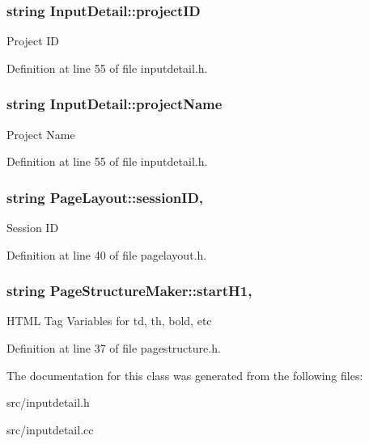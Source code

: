 \hypertarget{classInputDetail_a08069ee622c626c038b821ddcc7427b4}{
\subsubsection[{project\-I\-D}]{\setlength{\rightskip}{0pt plus 5cm}string Input\-Detail\-::project\-I\-D\hspace{0.3cm}{\ttfamily [protected]}}}\label{classInputDetail_a08069ee622c626c038b821ddcc7427b4}
Project I\-D 

Definition at line 55 of file inputdetail.\-h.

\hypertarget{classInputDetail_aaaf51475a2a4ddbe34e38c96bdb45bad}{
\subsubsection[{project\-Name}]{\setlength{\rightskip}{0pt plus 5cm}string Input\-Detail\-::project\-Name\hspace{0.3cm}{\ttfamily [protected]}}}\label{classInputDetail_aaaf51475a2a4ddbe34e38c96bdb45bad}
Project Name 

Definition at line 55 of file inputdetail.\-h.

\hypertarget{classPageLayout_ab796c4a12a3f9c089881085e508e2a1c}{
\subsubsection[{session\-I\-D}]{\setlength{\rightskip}{0pt plus 5cm}string Page\-Layout\-::session\-I\-D\hspace{0.3cm}{\ttfamily [protected]}, {\ttfamily [inherited]}}}\label{classPageLayout_ab796c4a12a3f9c089881085e508e2a1c}
Session I\-D 

Definition at line 40 of file pagelayout.\-h.

\hypertarget{classPageStructureMaker_af41d4e21b808f5f8dc2c727f775b6fb2}{
\subsubsection[{start\-H1}]{\setlength{\rightskip}{0pt plus 5cm}string Page\-Structure\-Maker\-::start\-H1\hspace{0.3cm}{\ttfamily [protected]}, {\ttfamily [inherited]}}}\label{classPageStructureMaker_af41d4e21b808f5f8dc2c727f775b6fb2}
H\-T\-M\-L Tag Variables for td, th, bold, etc 

Definition at line 37 of file pagestructure.\-h.



The documentation for this class was generated from the following files\-:\begin{DoxyCompactItemize}
\item 
src/inputdetail.\-h\item 
src/inputdetail.\-cc\end{DoxyCompactItemize}
